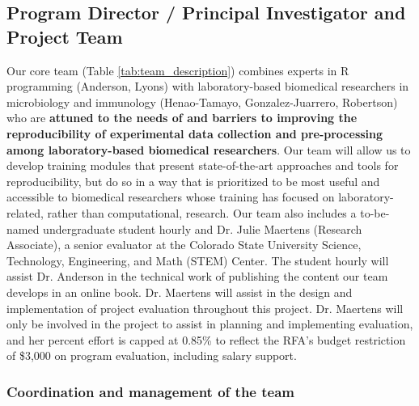 \documentclass[pdftex,english,11.5pt,parskip=half]{scrartcl}
\begin{document}
\subsection{Program Director / Principal Investigator and Project Team}



Our core team (Table \ref*{tab:team_description}) combines experts in R programming (Anderson, Lyons) with
laboratory-based biomedical researchers in microbiology and immunology
(Henao-Tamayo, Gonzalez-Juarrero, Robertson) who are \textbf{attuned to the
needs of and barriers to improving the reproducibility of experimental data
collection and pre-processing among laboratory-based biomedical researchers}.
Our team will allow us to develop training modules that present state-of-the-art
approaches and tools for reproducibility, but do so in a way that is prioritized
to be most useful and accessible to biomedical researchers whose training has
focused on laboratory-related, rather than computational, research. 
Our team also includes a to-be-named undergraduate student hourly and Dr. Julie Maertens (Research Associate), a senior evaluator
at the Colorado State University Science, Technology, Engineering, and Math (STEM) Center. The student hourly will assist Dr. Anderson
in the technical work of publishing the content our team develops in an online book. 
Dr. Maertens will assist in the design and
implementation of project evaluation throughout this project. Dr. Maertens will
only be involved in the project to assist in planning and implementing
evaluation, and her percent effort is capped at 0.85\% to reflect the RFA's
budget restriction of \$3,000 on program evaluation, including salary
support.

\subsubsection*{Coordination and management of the team}


\end{document}
